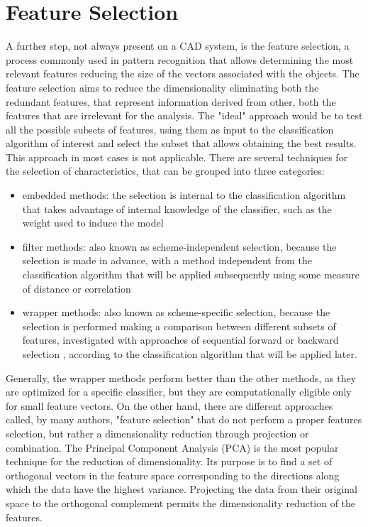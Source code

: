 \documentclass[final,a4paper,12pt,english]{UnicaPhdThesis3}
\begin{document}
\section{Feature Selection} \label{FS}
A further step, not always present on a CAD system, is the feature selection, a process commonly used in pattern recognition that allows determining the most relevant features reducing the size of the vectors associated with the objects. The feature selection aims to reduce the dimensionality eliminating both the redundant features, that represent information derived from other, both the features that are irrelevant for
the analysis. The "ideal" approach would be to test all the possible subsets of features, using them as input to the classification algorithm of interest and select the subset that allows obtaining the best results. This approach in most cases is not applicable. There are several techniques for the selection of characteristics, that can be grouped into three categories:
\begin{itemize}
	\item embedded methods: the selection is internal to the classification algorithm that takes advantage of internal knowledge of the classifier, such as the weight used to induce the model \cite{Duda}
	\item filter methods: also known as scheme-independent selection, because the selection is made in advance, with a method independent from the classification algorithm that will be applied subsequently using some measure of distance or correlation \cite{Yu}
	\item wrapper methods: also known as scheme-specific selection, because the selection is performed making a comparison between different subsets of features, investigated with approaches of sequential forward or backward selection \cite{Kittler}, according to the classification algorithm that will be applied later.
\end{itemize}
Generally, the wrapper methods perform better than the other methods, as they are optimized for a specific classifier, but they are computationally eligible only for small feature vectors.
On the other hand, there are different approaches called, by many authors, "feature selection" that do not perform a proper features selection, but rather a dimensionality reduction through projection or combination. The Principal Component Analysis (\acs{PCA}) \cite{Wold} is the most popular technique for the reduction of dimensionality. Its purpose is to find a set of orthogonal vectors in the feature space corresponding to the directions along which the data have the highest variance. Projecting the data from their original space to the orthogonal complement permits the dimensionality reduction of the features. 
\end{document}
